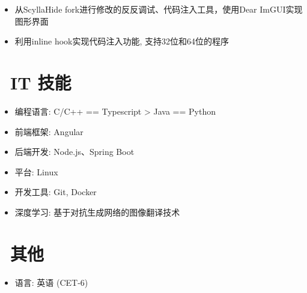 \documentclass{resume}
\begin{document}

\begin{onehalfspacing}
\begin{itemize}
  \item 从ScyllaHide fork进行修改的反反调试、代码注入工具，使用Dear ImGUI实现图形界面
  \item 利用inline hook实现代码注入功能, 支持32位和64位的程序
\end{itemize}
\end{onehalfspacing}

\section{\faCogs\ IT 技能}
\begin{itemize}[parsep=0.5ex]
  \item 编程语言: C/C++ == Typescript > Java == Python
  \item 前端框架: Angular
  \item 后端开发: Node.js、Spring Boot
  \item 平台: Linux
  \item 开发工具: Git, Docker
  \item 深度学习: 基于对抗生成网络的图像翻译技术
\end{itemize}


\section{\faInfo\ 其他}
\begin{itemize}[parsep=0.5ex]
  \item 语言: 英语 (CET-6)
\end{itemize}

%
%
\end{document}
